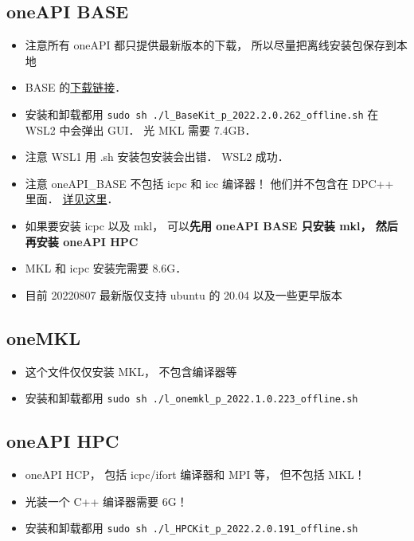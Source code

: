 
\subsection{oneAPI BASE}
\begin{itemize}
\item 注意所有 oneAPI 都只提供最新版本的下载， 所以尽量把离线安装包保存到本地
\item BASE 的\href{https://www.intel.com/content/www/us/en/developer/tools/oneapi/base-toolkit-download.html?operatingsystem=linux&distributions=webdownload&options=offline}{下载链接}．
\item 安装和卸载都用 \verb`sudo sh ./l_BaseKit_p_2022.2.0.262_offline.sh` 在 WSL2 中会弹出 GUI． 光 MKL 需要 7.4GB．
\item 注意 WSL1 用 .sh 安装包安装会出错． WSL2 成功．
\item 注意 oneAPI_BASE 不包括 icpc 和 icc 编译器！ 他们并不包含在 DPC++ 里面． \href{https://stackoverflow.com/questions/66527842/can-not-find-the-icc-compiler-after-having-installed-intel-oneapi-invoking-from}{详见这里}．
\item 如果要安装 icpc 以及 mkl， 可以\textbf{先用 oneAPI BASE 只安装 mkl， 然后再安装 oneAPI HPC}
\item MKL 和 icpc 安装完需要 8.6G．
\item 目前 20220807 最新版仅支持 ubuntu 的 20.04 以及一些更早版本
\end{itemize}

\subsection{oneMKL}
\begin{itemize}
\item 这个文件仅仅安装 MKL， 不包含编译器等
\item 安装和卸载都用 \verb`sudo sh ./l_onemkl_p_2022.1.0.223_offline.sh`
\end{itemize}

\subsection{oneAPI HPC}
\begin{itemize}
\item oneAPI HCP， 包括 icpc/ifort 编译器和 MPI 等， 但不包括 MKL！
\item 光装一个 C++ 编译器需要 6G！
\item 安装和卸载都用 \verb`sudo sh ./l_HPCKit_p_2022.2.0.191_offline.sh`
\end{itemize}
